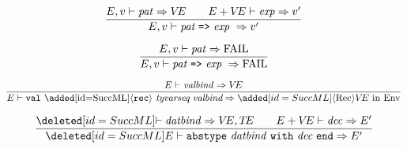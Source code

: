 \begin{equation}	%
\frac{\E,\V\ts\pat\ra\VE\qquad\E+\VE\ts\exp\ra\V'}
     {\E,\V\ts\longmrule\ \ra\V'}\index{54.2}
\end{equation}

\begin{equation}	%
\frac{\E,\V\ts\pat\ra\FAIL}
     {\E,\V\ts\longmrule\ \ra\FAIL}
\end{equation}

%
%
\begin{equation}	%
\frac{\E\ts\valbind\ra\VE}
     {\E\ts\explicitvaldec\ra \ADD{\langle\Rec\rangle} \VE\ \In\ \Env}\index{54.3}
\end{equation}

\insertion{\thedatatyperepl}{\begin{equation}
\frac{\ts\typbind\ra\TE}
     {\E\ts\typedec\ra\TE\ \In\ \Env}
\end{equation}}

\insertion{\thedatatyperepl}{
\begin{equation}
\frac{\ts\datbind\ra\VE,\TE}
     {\E\ts\datatypedec\ra(\VE,\TE)\ \In\ \Env}
\end{equation}}

\insertion{\thedatatyperepl}{\begin{equation}
\frac{\E(\longtycon) = \VE}
     {
          \E\ts\datatyperepldec\ra
          (\VE,\{\tycon\mapsto\VE\})\ \In\ \Env
      }
\end{equation}}

\begin{equation}
\frac{\CUT{\ts\datbind\ra\VE,\TE\qquad \E+\VE\ts\dec\ra \E'}}
     {\CUT{\E\ts\abstypedec \ra \E'}}
\end{equation}%

